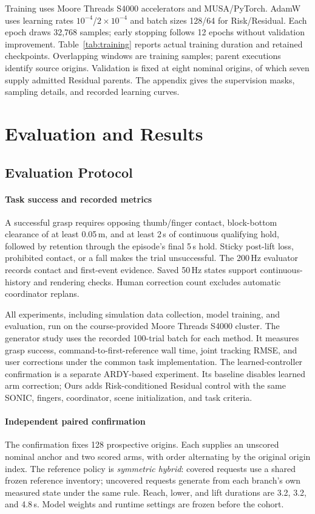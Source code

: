 \documentclass[letterpaper,10pt,conference]{ieeeconf}
\begin{document}
Training uses Moore Threads S4000 accelerators and MUSA/PyTorch. AdamW~\cite{adamw} uses learning rates $10^{-4}$/$2\times10^{-4}$ and batch sizes 128/64 for Risk/Residual. Each epoch draws 32,768 samples; early stopping follows 12 epochs without validation improvement. Table~\ref{tab:training} reports actual training duration and retained checkpoints. Overlapping windows are training samples; parent executions identify source origins. Validation is fixed at eight nominal origins, of which seven supply admitted Residual parents. The appendix gives the supervision masks, sampling details, and recorded learning curves.

\section{Evaluation and Results}
\subsection{Evaluation Protocol}
\paragraph{Task success and recorded metrics}
A successful grasp requires opposing thumb/finger contact, block-bottom clearance of at least 0.05\,m, and at least 2\,s of continuous qualifying hold, followed by retention through the episode's final 5\,s hold. Sticky post-lift loss, prohibited contact, or a fall makes the trial unsuccessful. The 200\,Hz evaluator records contact and first-event evidence. Saved 50\,Hz states support continuous-history and rendering checks. Human correction count excludes automatic coordinator replans.

All experiments, including simulation data collection, model training, and evaluation, run on the course-provided Moore Threads S4000 cluster. The generator study uses the recorded 100-trial batch for each method. It measures grasp success, command-to-first-reference wall time, joint tracking RMSE, and user corrections under the common task implementation. The learned-controller confirmation is a separate ARDY-based experiment. Its baseline disables learned arm correction; Ours adds Risk-conditioned Residual control with the same SONIC, fingers, coordinator, scene initialization, and task criteria.

\paragraph{Independent paired confirmation}
The confirmation fixes 128 prospective origins. Each supplies an unscored nominal anchor and two scored arms, with order alternating by the original origin index. The reference policy is \emph{symmetric hybrid}: covered requests use a shared frozen reference inventory; uncovered requests generate from each branch's own measured state under the same rule. Reach, lower, and lift durations are 3.2, 3.2, and 4.8\,s. Model weights and runtime settings are frozen before the cohort.
\end{document}
